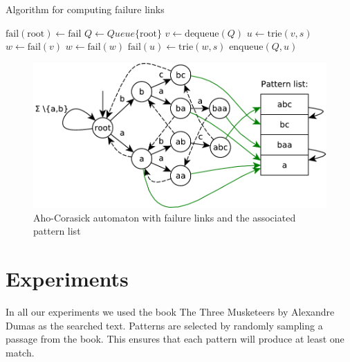 \documentclass[final]{beamer}
\begin{document}
\begin{poster}
\begin{algorithm} [H]
\small
\caption{Algorithm for computing failure links}
\label{alg:ac_fail}

\begin{algorithmic}[1]
\State $ \text{fail}(\text{root}) \gets \text{fail}$
\State $Q \gets Queue\{\text{root}\}$
    \State $v \gets \text{dequeue}(Q) $
        \State $u \gets \text{trie}(v,s)$ 
        \State $w \gets \text{fail}(v)$ 
            \State $w \gets \text{fail}(w)$ 
        \EndWhile
        \State $ \text{fail}(u) \gets \text{trie}(w,s)$
        \State $\text{enqueue}(Q,u)$
    \EndFor
\EndWhile
\end{algorithmic}
\end{algorithm}

%

\begin{figure}
\centering
 \includegraphics[width=23cm]{aho_corasick.pdf}
\caption{Aho-Corasick automaton with failure links and the associated pattern list}
\label{fig:ac_machine}
\end{figure}

\section{Experiments}
In all our experiments we used the book The Three Musketeers by Alexandre Dumas as the
searched text.
Patterns are selected by randomly sampling a passage from the book.
This ensures that each pattern will produce at least one match.


\end{poster}
\end{document}
